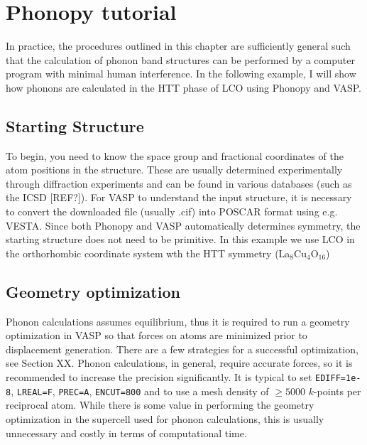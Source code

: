 \lstset{basicstyle=\ttfamily\footnotesize, breaklines=true, frame=single}

\chapter{Phonopy tutorial}
In practice, the procedures outlined in this chapter are sufficiently general such that the calculation of phonon band structures can be performed by a computer program with minimal human interference. In the following example, I will show how phonons are calculated in the HTT phase of LCO using Phonopy and VASP.

\section{Starting Structure}
To begin, you need to know the space group and fractional coordinates of the atom positions in the structure. These are usually determined experimentally through diffraction experiments and can be found in various databases (such as the ICSD [REF?]). For VASP to understand the input structure, it is necessary to convert the downloaded file (usually .cif) into POSCAR format using e.g. VESTA. Since both Phonopy and VASP automatically determines symmetry, the starting structure does not need to be primitive. In this example we use LCO in the orthorhombic coordinate system wth the HTT symmetry (La$_8$Cu$_4$O$_{16}$)

\section{Geometry optimization}
Phonon calculations assumes equilibrium, thus it is required to run a geometry optimization in VASP so that forces on atoms are minimized prior to displacement generation. There are a few strategies for a successful optimization, see Section XX. Phonon calculations, in general, require accurate forces, so it is recommended to increase the precision significantly. It is typical to set \texttt{EDIFF=1e-8}, \texttt{LREAL=F}, \texttt{PREC=A}, \texttt{ENCUT=800} and to use a mesh density of $\geq 5000$ $k$-points per reciprocal atom. While there is some value in performing the geometry optimization in the supercell used for phonon calculations, this is usually unnecessary and costly in terms of computational time.

